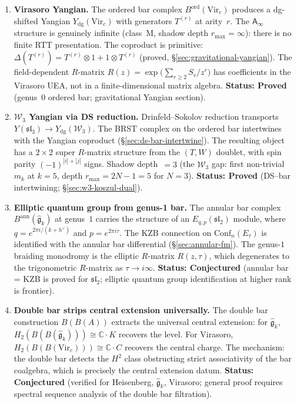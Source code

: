 \documentclass[11pt]{article}
\newcommand{\cW}{\mathcal{W}}
\newcommand{\fg}{\mathfrak{g}}
\newcommand{\fsl}{\mathfrak{sl}}
\newcommand{\C}{\mathbb{C}}
\newcommand{\Ainf}{\mathsf{A}_{\infty}}
\begin{document}
\begin{enumerate}[label=\textbf{A\arabic*.},leftmargin=2.5em]

\item \textbf{Virasoro Yangian.}
The ordered bar complex $B^{\mathrm{ord}}(\mathrm{Vir}_c)$ produces a
dg-shifted Yangian $Y_{\mathrm{dg}}(\mathrm{Vir}_c)$ with generators
$T^{(r)}$ at arity~$r$.  The $\Ainf$ structure is genuinely infinite
(class~M, shadow depth $r_{\max} = \infty$): there is no finite RTT
presentation.  The coproduct is primitive:
$\Delta(T^{(r)}) = T^{(r)} \otimes 1 + 1 \otimes T^{(r)}$ (proved,
\S\ref{sec:gravitational-yangian}).  The field-dependent $R$-matrix
$R(z) = \exp\!\bigl(\sum_{r \ge 2} S_r / z^r\bigr)$ has coefficients
in the Virasoro UEA, not in a finite-dimensional matrix algebra.
\textbf{Status: Proved} (genus~0 ordered bar; gravitational Yangian section).

\item \textbf{$\cW_3$ Yangian via DS reduction.}
Drinfeld--Sokolov reduction transports $Y(\fsl_3) \to Y_{\mathrm{dg}}(\cW_3)$.
The BRST complex on the ordered bar intertwines with the Yangian coproduct
(\S\ref{sec:ds-bar-intertwine}).  The resulting object has a $2 \times 2$
super $R$-matrix structure from the $(T, W)$ doublet, with spin parity
$(-1)^{|i|+|j|}$ signs.  Shadow depth~$= 3$ (the $\cW_3$ gap: first
non-trivial $m_k$ at $k = 5$, depth $r_{\max} = 2N-1 = 5$ for $N = 3$).
\textbf{Status: Proved} (DS--bar intertwining; \S\ref{sec:w3-koszul-dual}).

\item \textbf{Elliptic quantum group from genus-1 bar.}
The annular bar complex $B^{\mathrm{ann}}(\hat{\fg}_k)$ at genus~$1$
carries the structure of an $E_{q,p}(\fsl_2)$ module, where $q = e^{2\pi i/(k+h^\vee)}$
and $p = e^{2\pi i\tau}$.  The KZB connection on $\mathrm{Conf}_n(E_\tau)$
is identified with the annular bar differential
(\S\ref{sec:annular-fm}).  The genus-$1$ braiding monodromy is the
elliptic $R$-matrix $R(z,\tau)$, which degenerates to the trigonometric
$R$-matrix as $\tau \to i\infty$.
\textbf{Status: Conjectured} (annular bar = KZB is proved for $\fsl_2$;
elliptic quantum group identification at higher rank is frontier).

\item \textbf{Double bar strips central extension universally.}
The double bar construction $B(B(A))$ extracts the universal central
extension: for $\hat{\fg}_k$, $H_2(B(B(\hat{\fg}_k))) \cong \C \cdot K$
recovers the level.  For Virasoro, $H_2(B(B(\mathrm{Vir}_c))) \cong \C \cdot C$
recovers the central charge.  The mechanism: the double bar detects
the $H^2$ class obstructing strict associativity of the bar coalgebra,
which is precisely the central extension datum.
\textbf{Status: Conjectured} (verified for Heisenberg, $\hat{\fg}_k$,
Virasoro; general proof requires spectral sequence analysis of
the double bar filtration).


\end{enumerate}
\end{document}
